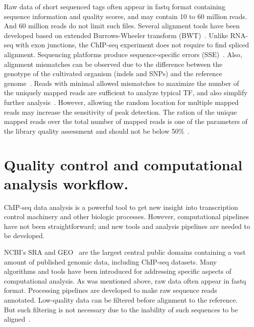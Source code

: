 Raw data of short sequenced tags often appear in fastq format containing sequence information and quality scores, and may contain 10 to 60 million reads. 
And 60 million reads do not limit such files.
Several alignment tools have been developed based on extended Burrows-Wheeler transform (BWT)~\cite{li2009fast, siren2014indexing}.
Unlike RNA-seq with exon junctions, the ChIP-seq experiment does not require to find spliced alignment. 
Sequencing platforms produce sequence-specific errors (SSE)~\cite{nakamura2011sequence}. 
Also, alignment mismatches can be observed due to the difference between the genotype of the cultivated organism (indels and SNPs) and the reference genome~\cite{park2009chip}.
Reads with minimal allowed mismatches to maximize the number of the uniquely mapped reads are sufficient to analyze typical TF, and also simplify further analysis~\cite{derrien2012fast}.
However, allowing the random location for multiple mapped reads may increase the sensitivity of peak detection. 
The ration of the unique mapped reads over the total number of mapped reads is one of the parameters of the library quality assessment and should not be below 50\%~\cite{shin2013computational}.

\section{Quality control and computational analysis workflow.}

ChIP-seq data analysis is a powerful tool to get new insight into transcription control machinery and other biologic processes. 
However, computational pipelines have not been straightforward; 
and new tools and analysis pipelines are needed to be developed.

NCBI's SRA and GEO~\cite{barrett2012ncbi} are the largest central public domains containing a vast amount of published genomic data, including ChIP-seq datasets. 
Many algorithms and tools have been introduced for addressing specific aspects of computational analysis. 
As was mentioned above, raw data often appear in fastq format. 
Processing pipelines are developed to make raw sequence reads annotated.
Low-quality data can be filtered before alignment to the reference. 
But such filtering is not necessary due to the inability of such sequences to be aligned~\cite{furey2012chip}.

